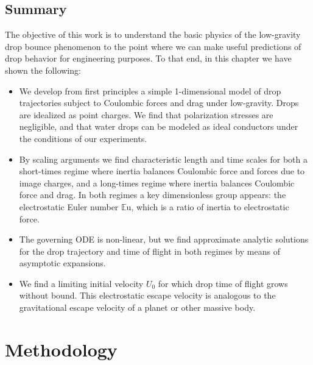 \documentclass[12pt,a4paper,oneside]{book}
\begin{document}
\section{Summary}
The objective of this work is to understand the basic physics of the low-gravity drop bounce phenomenon to the point where we can make useful predictions of drop behavior for engineering purposes. To that end, in this chapter we have shown the following:
\begin{itemize}
\item We develop from first principles a simple 1-dimensional model of drop trajectories subject to Coulombic forces and drag under low-gravity. Drops are idealized as point charges. We find that polarization stresses are negligible, and that water drops can be modeled as ideal conductors under the conditions of our experiments.
\item By scaling arguments we find characteristic length and time scales for both a short-times regime where inertia balances Coulombic force and forces due to image charges, and a long-times regime where inertia balances Coulombic force and drag. In both regimes a key dimensionless group appears: the electrostatic Euler number $\mathbb{E}\mbox{u}$, which is a ratio of inertia to electrostatic force. 
\item The governing ODE is non-linear, but we find approximate analytic solutions for the drop trajectory and time of flight in both regimes by means of asymptotic expansions.
\item We find a limiting initial velocity $U_0$ for which drop time of flight grows without bound. This electrostatic escape velocity is analogous to the gravitational escape velocity of a planet or other massive body. 
\end{itemize} 

\chapter{Methodology}
\end{document}
